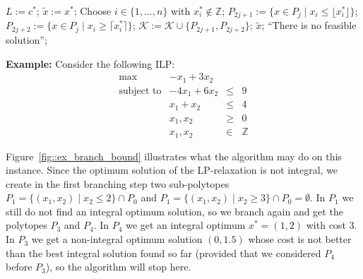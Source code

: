 \documentclass[12pt, showidx, twoside]{article}
\def\Z{\mathbb{Z}}
\begin{document}
{{\begin{algorithm}[htb]{}
{{     
     {
        \If{$x^* \in \Z^n$}
        {
           $L:= c^*$;\;
           $\tilde x := x^*$;\;
        }
        \Else
        {
           Choose $i \in \{1,\dots,n\}$ with $x_i^* \not\in \Z$;\;\label{bb::line_choose_xi}
           $P_{2j + 1} := \{x \in P_j \mid x_i \leq \lfloor x_i^* \rfloor\}$;\;
           $P_{2j + 2} := \{x \in P_j \mid x_i \geq \lceil x_i^* \rceil\}$;\;
           $\mathcal{K} := \mathcal{K} \cup \{P_{2j + 1}, P_{2j + 2}\}$;\;
        }
     }
     }
  }
  {
        \Return $\tilde x$;\;
  }
  \Else
  {
     \Return ``There is no feasible solution'';\;
  }
 \caption{Branch-and-Bound Algorithm}\label{alg::branch_and_bound}
\end{algorithm}


{\bf Example:} Consider the following ILP:
  \begin{equation*}
  \begin{array}{rrcl}
    \max &  -x_1 + 3x_2 & & \\   
    \text{subject to} &  -4x_1 + 6x_2 & \le & 9\\
       &  x_1 +  x_2  & \le & 4\\
       &  x_1, x_2    & \ge & 0\\
       & x_1, x_2     & \in & \Z
  \end{array}
  \end{equation*}

Figure~\ref{fig::ex_branch_bound} illustrates what the algorithm may do on this 
instance. Since the optimum solution of the LP-relaxation is not integral, we create
in the first branching step two sub-polytopes 
$P_1 = \{(x_1,x_2) \mid x_2 \leq 2\} \cap P_0$ and
$P_1 = \{(x_1,x_2) \mid x_2 \geq 3\} \cap P_0 = \emptyset$.
In $P_1$ we still do not find an integral optimum solution, so we 
branch again and get the polytopes $P_3$ and $P_4$. In $P_4$ we get an integral 
optimum $x^* = (1,2)$ with cost $3$. In $P_3$ we get a non-integral optimum 
solution $(0,1.5)$ whose cost is not better than the best integral solution
found so far (provided that we considered $P_4$ before $P_3$), so the algorithm 
will stop here.


\begin{figure}[htb]
\begin{center}

\end{center}
\end{figure}}}
\end{document}

